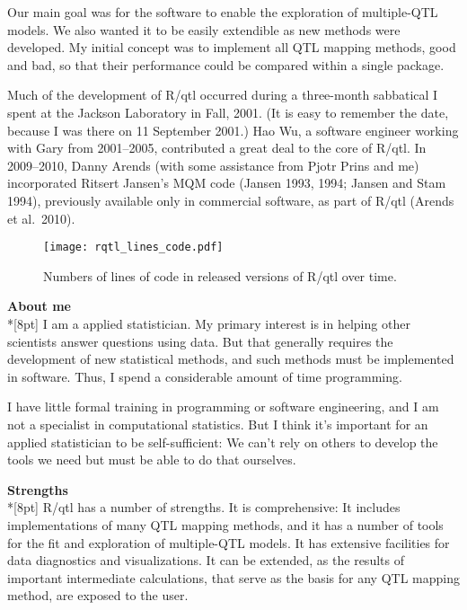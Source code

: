 \documentclass[letterpaper]{article}
\begin{document}
\begin{multicols}{2}
Our main goal was for the software to enable the exploration of
multiple-QTL models. We also wanted it to be easily extendible as new
methods were developed.  My initial concept was to implement all QTL
mapping methods, good and bad, so that their performance could be
compared within a single package.

Much of the development of R/qtl occurred during a three-month
sabbatical I spent at the Jackson Laboratory in Fall, 2001.  (It is
easy to remember the date, because I was there on 11 September 2001.)  Hao
Wu, a software engineer working with Gary from 2001--2005, contributed
a great deal to the core of R/qtl. In 2009--2010, Danny Arends (with
some assistance from Pjotr Prins and me) incorporated Ritsert Jansen's
MQM code (Jansen 1993, 1994; Jansen and Stam 1994), previously
available only in commercial software, as part of R/qtl (Arends et
al.\ 2010).




\begin{figure*}[tbh]
\begin{center}
\texttt{[image: rqtl\_lines\_code.pdf]}
\caption{Numbers of lines of code in released versions of R/qtl over
  time.}
\end{center}
\end{figure*}



\bigskip
{}
\noindent \textbf{\sffamily About me}\\*[8pt]
I am a applied statistician. My primary interest is in helping other
scientists answer questions using data. But that generally requires
the development of new statistical methods, and such methods must be
implemented in software.  Thus, I spend a considerable amount of time
programming.

I have little formal training in programming or software engineering,
and I am not a specialist in computational statistics.  But I think
it's important for an applied statistician to be self-sufficient: We
can't rely on others to develop the tools we need but must be able to
do that ourselves.



\bigskip
{}
\noindent \textbf{\sffamily Strengths}\\*[8pt]
R/qtl has a number of strengths. It is comprehensive: It includes
implementations of many QTL mapping methods, and it has a number of
tools for the fit and exploration of multiple-QTL models. It has
extensive facilities for data diagnostics and visualizations. It can
be extended, as the results of important intermediate calculations,
that serve as the basis for any QTL mapping method, are exposed to the
user.


\end{multicols}
\end{document}
